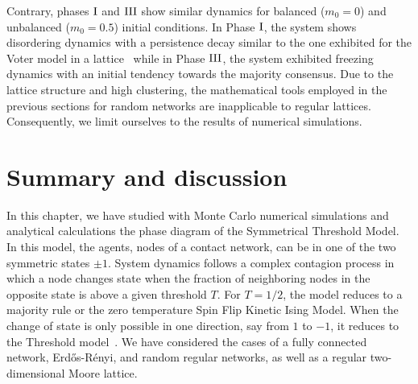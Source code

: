 \begin{figure}[ht]
{		%
		}
\end{figure}
Contrary, phases ${\rm I}$ and ${\rm III}$ show similar dynamics for balanced ($m_0 = 0$) and unbalanced ($m_0 = 0.5$) initial conditions. In Phase ${\rm I}$, the system shows disordering dynamics with a persistence decay similar to the one exhibited for the Voter model in a lattice~\cite{ben-naim-1996} while in Phase ${\rm III}$, the system exhibited freezing dynamics with an initial tendency towards the majority consensus. Due to the lattice structure and high clustering, the mathematical tools employed in the previous sections for random networks are inapplicable to regular lattices. Consequently, we limit ourselves to the results of numerical simulations.


\section{\label{sec:Summary and Conclusions_STM} Summary and discussion}

In this chapter, we have studied with Monte Carlo numerical simulations and analytical calculations the phase diagram of the Symmetrical Threshold Model. In this model, the agents, nodes of a contact  network, can be in one of the two symmetric states $\pm 1$.  System dynamics follows a complex contagion process in which a node changes state when the fraction of neighboring nodes in the opposite state is above a given threshold $T$. For $T=1/2$, the model reduces to a majority rule or the zero temperature Spin Flip Kinetic Ising Model. When the change of state is only possible in one direction, say from $1$ to $-1$, it reduces to the Threshold model~\cite{granovetter-1978,watts-2002}. We have considered the cases of a fully connected network, Erd\H{o}s-Rényi, and random regular networks, as well as a regular two-dimensional Moore lattice. 

